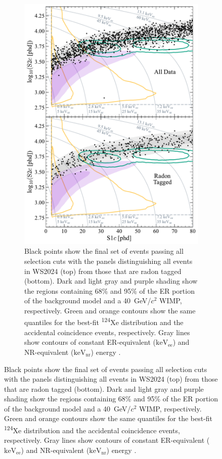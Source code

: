 \begin{figure}[!ht]
	\centering
	\begin{subfigure}[b]{0.49\textwidth}
		\centering
		\includegraphics[width=\textwidth]{figures/WS2024Result/figure3.pdf}
        \caption{Black points show the final set of events passing all selection cuts with the panels distinguishing all events in WS2024 (top) from those that are radon tagged (bottom). Dark and light gray and purple shading show the regions containing 68\% and 95\% of the ER portion of the background model and a 40~GeV/$c^2$ WIMP, respectively. Green and orange contours show the same quantiles for the best-fit \textsuperscript{124}Xe distribution and the accidental coincidence events, respectively. Gray lines show contours of constant ER-equivalent ($\text{keV}_\text{ee}$) and NR-equivalent ($\text{keV}_\text{nr}$) energy \cite{LZCollaboration:2024lux}.}
		\label{fig:WS2024Result/fig3}
	\end{subfigure}

\end{figure}
